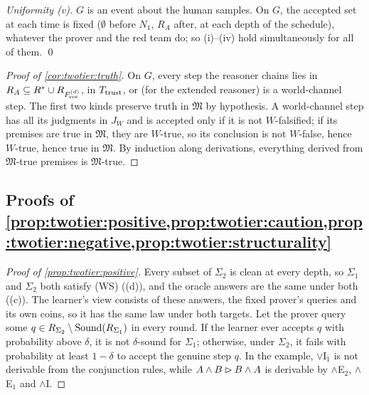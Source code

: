 \emph{Uniformity (v).} $G$ is an event about the human samples. On $G$, the accepted set at each time is fixed ($\emptyset$ before $N_1$, $R_A$ after, at each depth of the schedule), whatever the prover and the red team do; so (i)--(iv) hold simultaneously for all of them. \qed

\begin{proof}[Proof of \cref{cor:twotier:truth}]
On $G$, every step the reasoner chains lies in $R_A\subseteq R^{*}\cup R_{F^{(d)}_{\mathrm{res}}}$, in $T_{\mathrm{trust}}$, or (for the extended reasoner) is a world-channel step. The first two kinds preserve truth in $\mathfrak M$ by hypothesis. A world-channel step has all its judgments in $J_W$ and is accepted only if it is not $W$-falsified; if its premises are true in $\mathfrak M$, they are $W$-true, so its conclusion is not $W$-false, hence $W$-true, hence true in $\mathfrak M$. By induction along derivations, everything derived from $\mathfrak M$-true premises is $\mathfrak M$-true.
\end{proof}

\subsection{Proofs of \texorpdfstring{\cref{prop:twotier:positive,prop:twotier:caution,prop:twotier:negative,prop:twotier:structurality}}{the propositions on positive data, caution, negative evidence and structurality}}\label{app:twotier:caution}

\begin{proof}[Proof of \cref{prop:twotier:positive}]
Every subset of $\Sigma_2$ is clean at every depth, so $\Sigma_1$ and $\Sigma_2$ both satisfy (WS) ((d)), and the oracle answers are the same under both ((c)). The learner's view consists of these answers, the fixed prover's queries and its own coins, so it has the same law under both targets. Let the prover query some $q\in R_{\Sigma_2}\setminus\mathrm{Sound}(R_{\Sigma_1})$ in every round. If the learner ever accepts $q$ with probability above $\delta$, it is not $\delta$-sound for $\Sigma_1$; otherwise, under $\Sigma_2$, it fails with probability at least $1-\delta$ to accept the genuine step $q$. In the example, $\vee\mathrm I_1$ is not derivable from the conjunction rules, while $A\wedge B\rhd B\wedge A$ is derivable by $\wedge$E$_2$, $\wedge$E$_1$ and $\wedge$I.
\end{proof}

